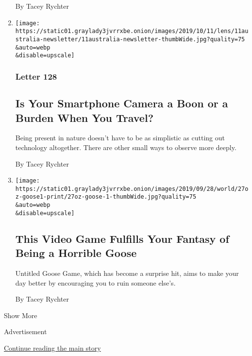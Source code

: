 \begin{enumerate}
  By Tacey Rychter
\item
  \href{/2019/10/10/world/australia/smartphones-travel.html}{}

  \texttt{[image: https://static01.graylady3jvrrxbe.onion/images/2019/10/11/lens/11australia-newsletter/11australia-newsletter-thumbWide.jpg?quality=75\\\&auto=webp\\\&disable=upscale]}

  \hypertarget{letter-128}{%
  \subsubsection{Letter 128}\label{letter-128}}

  \hypertarget{is-your-smartphone-camera-a-boon-or-a-burden-when-you-travel}{%
  \subsection{Is Your Smartphone Camera a Boon or a Burden When You
  Travel?}\label{is-your-smartphone-camera-a-boon-or-a-burden-when-you-travel}}

  Being present in nature doesn't have to be as simplistic as cutting
  out technology altogether. There are other small ways to observe more
  deeply.

  By Tacey Rychter
\item
  \href{/2019/09/27/world/australia/untitled-goose-game.html}{}

  \texttt{[image: https://static01.graylady3jvrrxbe.onion/images/2019/09/28/world/27oz-goose1-print/27oz-goose-1-thumbWide.jpg?quality=75\\\&auto=webp\\\&disable=upscale]}

  \hypertarget{this-video-game-fulfills-your-fantasy-of-being-a-horrible-goose}{%
  \subsection{This Video Game Fulfills Your Fantasy of Being a Horrible
  Goose}\label{this-video-game-fulfills-your-fantasy-of-being-a-horrible-goose}}

  Untitled Goose Game, which has become a surprise hit, aims to make
  your day better by encouraging you to ruin someone else's.

  By Tacey Rychter
\end{enumerate}

Show More

Advertisement

\protect\hyperlink{after-mid2}{Continue reading the main story}

